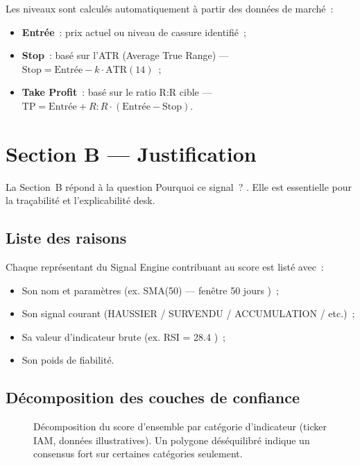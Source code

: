Les niveaux sont calculés automatiquement à partir des données de marché~:
\begin{itemize}
    \item \textbf{Entrée}~: prix actuel ou niveau de cassure identifié~;
    \item \textbf{Stop}~: basé sur l'ATR (Average True Range) — $\text{Stop} = \text{Entrée} - k \cdot \text{ATR}(14)$~;
    \item \textbf{Take Profit}~: basé sur le ratio R:R cible — $\text{TP} = \text{Entrée} + R:R \cdot (\text{Entrée} - \text{Stop})$.
\end{itemize}

\section{Section B --- Justification}
\label{sec:justification}

La Section~B répond à la question \og Pourquoi ce signal~? \fg{}. Elle est essentielle
pour la traçabilité et l'explicabilité desk.

\subsection{Liste des raisons}

Chaque représentant du Signal Engine contribuant au score est listé avec~:
\begin{itemize}
    \item Son nom et paramètres (ex. \og SMA(50) — fenêtre 50 jours \fg{})~;
    \item Son signal courant (HAUSSIER / SURVENDU / ACCUMULATION / etc.)~;
    \item Sa valeur d'indicateur brute (ex. \og RSI = 28.4 \fg{})~;
    \item Son poids de fiabilité.
\end{itemize}

\subsection{Décomposition des couches de confiance}

\begin{figure}[H]
\centering
{}
\caption{Décomposition du score d'ensemble par catégorie d'indicateur (ticker IAM, données illustratives).
Un polygone déséquilibré indique un consensus fort sur certaines catégories seulement.}
\label{fig:radar_chart}
\end{figure}

